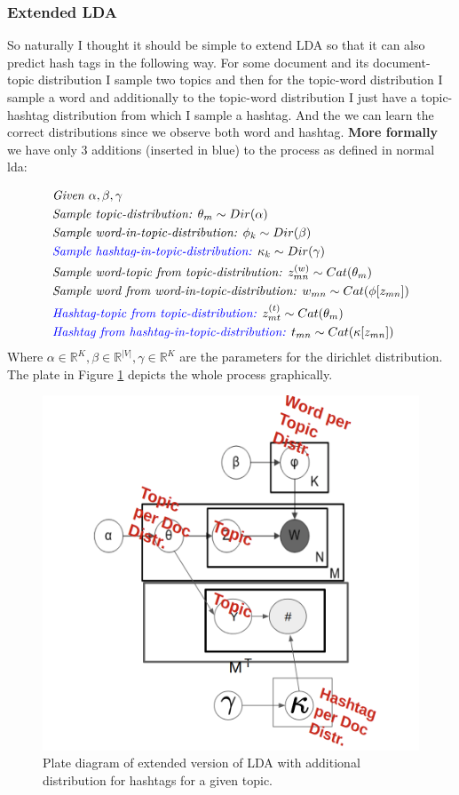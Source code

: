 \documentclass[10pt,conference,compsocconf]{IEEEtran}
\newcommand\R{\mathbb{R}}
\begin{document}
\subsubsection{Extended LDA}
So naturally I thought it should be simple to extend LDA so that it can also predict hash tags in the following way. For some document and its document-topic distribution I sample two topics and then for the topic-word distribution I sample a word and additionally to the topic-word distribution I just have a topic-hashtag distribution from which I sample a hashtag. And the we can learn the correct distributions since we observe both word and hashtag. \textbf{More formally} we have only 3 additions (inserted in blue) to the process as defined in normal lda: 

\small
\begin{align*}
&\textit{Given } \alpha, \beta, \gamma \\
&\textit{Sample topic-distribution: } \theta_m \sim Dir(\alpha)\\
&\textit{Sample word-in-topic-distribution: } \phi_k \sim Dir(\beta) \\
& \textcolor{blue}{\textit{Sample hashtag-in-topic-distribution: }} \kappa_k \sim Dir(\gamma) \\
&\textit{Sample word-topic from topic-distribution: } z^{(w)}_{mn} \sim Cat(\theta_m) \\
&\textit{Sample word from word-in-topic-distribution: } w_{mn} \sim Cat(\phi[z_{mn}])\\
&\textcolor{blue}{\textit{Hashtag-topic from topic-distribution: }} z^{(t)}_{mt} \sim Cat(\theta_m) \\
&\textcolor{blue}{\textit{Hashtag from hashtag-in-topic-distribution: }} t_{mn} \sim Cat(\kappa[z_{mn}])\\
\end{align*}
\normalsize
Where $\alpha \in \R^K, \beta \in \R^{|V|}, \gamma \in \R^K$ are the parameters for the dirichlet distribution. The plate in Figure \ref{fig:ldaplate2} depicts the whole process graphically.
\begin{figure}
	\centering
	\includegraphics[width=0.7\linewidth]{images/extended_lda}
	\caption{Plate diagram of extended version of LDA with additional distribution for hashtags for a given topic. }
	\label{fig:ldaplate2}
\end{figure}
\end{document}

